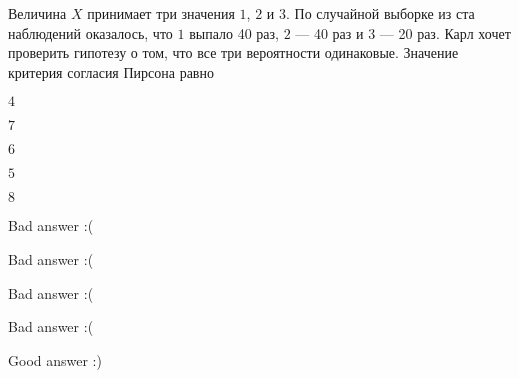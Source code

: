 
\begin{question}
Величина \(X\) принимает три значения \(1\), \(2\) и \(3\). По случайной
выборке из ста наблюдений оказалось, что \(1\) выпало 40 раз, \(2\) ---
40 раз и \(3\) --- 20 раз. Карл хочет проверить гипотезу о том, что все
три вероятности одинаковые. Значение критерия согласия Пирсона равно
\begin{answerlist}
  \item \(4\)
  \item \(7\)
  \item \(6\)
  \item \(5\)
  \item \(8\)
\end{answerlist}
\end{question}

\begin{solution}
\begin{answerlist}
  \item Bad answer :(
  \item Bad answer :(
  \item Bad answer :(
  \item Bad answer :(
  \item Good answer :)
\end{answerlist}
\end{solution}

